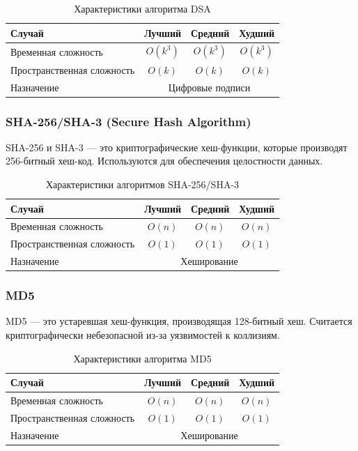 \documentclass[a4paper,12pt]{article}
\begin{document}
\begin{table}[H]
    \centering
    \begin{tabular}{|l|c|c|c|}
        \hline
        Случай & Лучший & Средний & Худший \\
        \hline
        Временная сложность & $O(k^3)$ & $O(k^3)$ & $O(k^3)$ \\
        \hline
        Пространственная сложность & $O(k)$ & $O(k)$ & $O(k)$ \\
        \hline
        Назначение & \multicolumn{3}{c|}{Цифровые подписи} \\
        \hline
    \end{tabular}
    \caption{Характеристики алгоритма DSA}
\end{table}

\subsubsection{SHA-256/SHA-3 (Secure Hash Algorithm)}
\label{subsubsec:sha-256-sha-3-secure-hash-algorithm}

SHA-256 и SHA-3 --- это криптографические хеш-функции, которые производят 256-битный хеш-код. Используются для обеспечения целостности данных.

\begin{table}[H]
    \centering
    \begin{tabular}{|l|c|c|c|}
        \hline
        Случай & Лучший & Средний & Худший \\
        \hline
        Временная сложность & $O(n)$ & $O(n)$ & $O(n)$ \\
        \hline
        Пространственная сложность & $O(1)$ & $O(1)$ & $O(1)$ \\
        \hline
        Назначение & \multicolumn{3}{c|}{Хеширование} \\
        \hline
    \end{tabular}
    \caption{Характеристики алгоритмов SHA-256/SHA-3}
\end{table}

\subsubsection{MD5}
\label{subsubsec:md5}

MD5 --- это устаревшая хеш-функция, производящая 128-битный хеш. Считается криптографически небезопасной из-за уязвимостей к коллизиям.

\begin{table}[H]
    \centering
    \begin{tabular}{|l|c|c|c|}
        \hline
        Случай & Лучший & Средний & Худший \\
        \hline
        Временная сложность & $O(n)$ & $O(n)$ & $O(n)$ \\
        \hline
        Пространственная сложность & $O(1)$ & $O(1)$ & $O(1)$ \\
        \hline
        Назначение & \multicolumn{3}{c|}{Хеширование} \\
        \hline
    \end{tabular}
    \caption{Характеристики алгоритма MD5}
\end{table}
\end{document}

